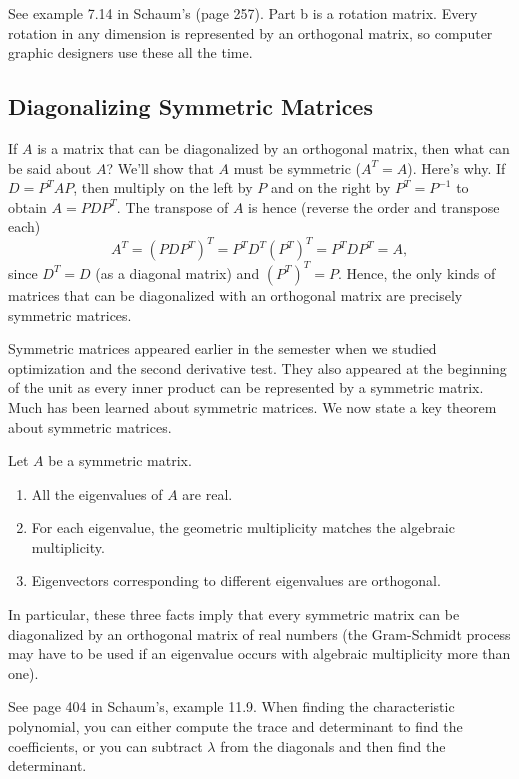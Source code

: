 \begin{example}
See example 7.14 in Schaum's (page 257). Part b is a rotation matrix. Every rotation in any dimension is represented by an orthogonal matrix, so computer graphic designers use these all the time.
\end{example}


\subsection{Diagonalizing Symmetric Matrices}

If $A$ is a matrix that can be diagonalized by an orthogonal matrix, then what can be said about $A$?  We'll show that $A$ must be symmetric ($A^T=A$).  Here's why.  If $D = P^T A P$, then multiply on the left by $P$ and on the right by $P^T=P^{-1}$ to obtain $A=P DP^T$. The transpose of $A$ is hence (reverse the order and transpose each) 
$$A^T = (PDP^T)^T = P^T D^T (P^T)^T = P^T D P^T = A,$$ since $D^T=D$ (as a diagonal matrix) and $(P^T)^T=P$.
Hence, the only kinds of matrices that can be diagonalized with an orthogonal matrix are precisely symmetric matrices.

Symmetric matrices appeared earlier in the semester when we studied optimization and the second derivative test.  They also appeared at the beginning of the unit as every inner product can be represented by a symmetric matrix.  Much has been learned about symmetric matrices. We now state a key theorem about symmetric matrices.
\begin{theorem}
Let $A$ be a symmetric matrix. 
\begin{enumerate}
	\item All the eigenvalues of $A$ are real.
	\item For each eigenvalue, the geometric multiplicity matches the algebraic multiplicity.
	\item Eigenvectors corresponding to different eigenvalues are orthogonal.
\end{enumerate}
In particular, these three facts imply that every symmetric matrix can be diagonalized by an orthogonal matrix of real numbers (the Gram-Schmidt process may have to be used if an eigenvalue occurs with algebraic multiplicity more than one). 
\end{theorem}

\begin{example}
See page 404 in Schaum's, example 11.9.  
When finding the characteristic polynomial, you can either compute the trace and determinant to find the coefficients, or you can subtract $\lambda$ from the diagonals and then find the determinant. 
\end{example}

